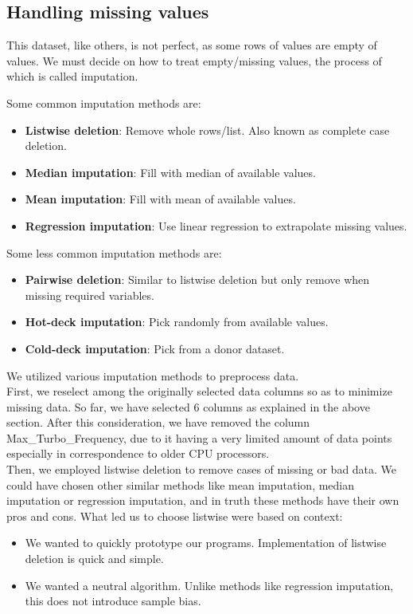 \subsection{Handling missing values}

This dataset, like others, is not perfect, as some rows of values are empty of values. We must decide on how to treat empty/missing values, the process of which is called imputation.

Some common imputation methods are:
\begin{itemize}
    \item \textbf{Listwise deletion}: Remove whole rows/list. Also known as complete case deletion.
    \item \textbf{Median imputation}: Fill with median of available values.
    \item \textbf{Mean imputation}: Fill with mean of available values.
    \item \textbf{Regression imputation}: Use linear regression to extrapolate missing values.
\end{itemize}

Some less common imputation methods are:
\begin{itemize}
    \item \textbf{Pairwise deletion}: Similar to listwise deletion but only remove when missing required variables.
    \item \textbf{Hot-deck imputation}: Pick randomly from available values.
    \item \textbf{Cold-deck imputation}: Pick from a donor dataset.
\end{itemize}

We utilized various imputation methods to preprocess data.\\

First, we reselect among the originally selected data columns so as to minimize missing data. So far, we have selected 6 columns as explained in the above section. After this consideration, we have removed the column Max\_Turbo\_Frequency, due to it having a very limited amount of data points especially in correspondence to older CPU processors.\\

Then, we employed listwise deletion to remove cases of missing or bad data. We could have chosen other similar methods like mean imputation, median imputation or regression imputation, and in truth these methods have their own pros and cons. What led us to choose listwise were based on context:
\begin{itemize}
    \item We wanted to quickly prototype our programs. Implementation of listwise deletion is quick and simple.
    \item We wanted a neutral algorithm. Unlike methods like regression imputation, this does not introduce sample bias.
\end{itemize}

